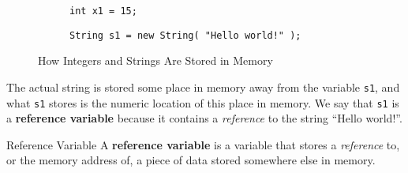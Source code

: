 \begin{figure}[ht]
    \begin{center}
        \sffamily
        \begin{subfigure}{0.2\textwidth}
            \begin{center}
        \end{center}
            \caption{\texttt{int x1 = 15;}}
        \end{subfigure}%
        \begin{subfigure}{0.4\textwidth}
            \begin{center}
            \end{center}
            \caption{\texttt{String s1 = new String( "Hello world!" );}}
        \end{subfigure}
    \end{center}
    \caption{How Integers and Strings Are Stored in Memory}
    \label{fig:reference-variable}
\end{figure}

The actual string is stored some place in memory away from the variable \texttt{s1}, and what \texttt{s1} stores is the numeric location of this place in memory.  We say that \texttt{s1} is a \textbf{reference variable} because it contains a \textit{reference} to the string ``Hello world!''.

\begin{defn}{Reference Variable}
    A \textbf{reference variable} is a variable that stores a \textit{reference} to, or the memory address of, a piece of data stored somewhere else in memory.
\end{defn}
